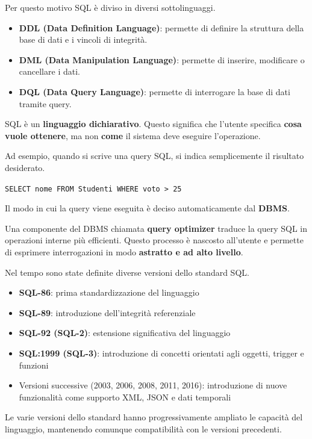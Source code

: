 Per questo motivo SQL è diviso in diversi sottolinguaggi.

\begin{itemize}
	\item \textbf{DDL (Data Definition Language)}: permette di definire la struttura della base di dati e i vincoli di integrità.
	\item \textbf{DML (Data Manipulation Language)}: permette di inserire, modificare o cancellare i dati.
	\item \textbf{DQL (Data Query Language)}: permette di interrogare la base di dati tramite query.
\end{itemize}

SQL è un \textbf{linguaggio dichiarativo}.  
Questo significa che l'utente specifica \textbf{cosa vuole ottenere}, ma non \textbf{come} il sistema deve eseguire l'operazione.

Ad esempio, quando si scrive una query SQL, si indica semplicemente il risultato desiderato.

\begin{center}
	\texttt{SELECT nome FROM Studenti WHERE voto > 25}
\end{center}

Il modo in cui la query viene eseguita è deciso automaticamente dal \textbf{DBMS}.

Una componente del DBMS chiamata \textbf{query optimizer} traduce la query SQL in operazioni interne più efficienti.  
Questo processo è nascosto all'utente e permette di esprimere interrogazioni in modo \textbf{astratto e ad alto livello}.


Nel tempo sono state definite diverse versioni dello standard SQL.

\begin{itemize}
	\item \textbf{SQL-86}: prima standardizzazione del linguaggio
	\item \textbf{SQL-89}: introduzione dell'integrità referenziale
	\item \textbf{SQL-92 (SQL-2)}: estensione significativa del linguaggio
	\item \textbf{SQL:1999 (SQL-3)}: introduzione di concetti orientati agli oggetti, trigger e funzioni
	\item Versioni successive (2003, 2006, 2008, 2011, 2016): introduzione di nuove funzionalità come supporto XML, JSON e dati temporali
\end{itemize}

Le varie versioni dello standard hanno progressivamente ampliato le capacità del linguaggio, mantenendo comunque compatibilità con le versioni precedenti.
